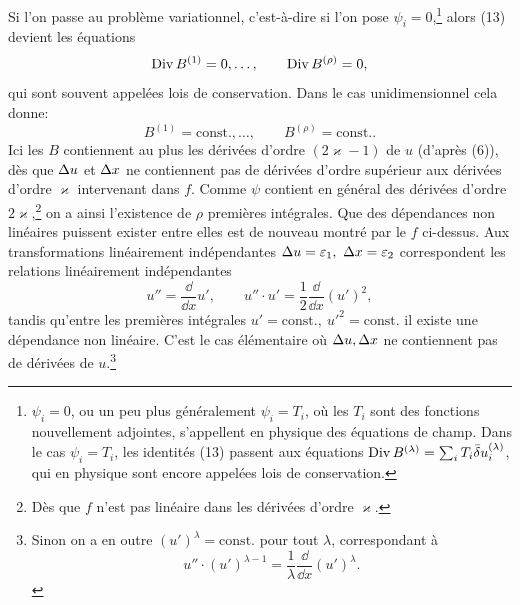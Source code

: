 Si l'on passe au problème variationnel, c'est-à-dire si l'on pose \(\psi_i=0\),\footnote{\(\psi_i=0\), ou un peu plus généralement \(\psi_i=T_i\), où les \(T_i\) sont des fonctions nouvellement adjointes, s'appellent en physique des \og{}équations de champ\fg{}. Dans le cas \(\psi_i=T_i\), les identités (13) passent aux équations \(\operatorname{Div} B^{(\lambda)}=\sum_i T_i\bar{\delta} u_i^{(\lambda)}\), qui en physique sont encore appelées lois de conservation.} alors (13) devient les équations
\[
\operatorname{Div} B^{(1)}=0,\ldots,\qquad \operatorname{Div} B^{(\rho)}=0,
\]
qui sont souvent appelées \og{}lois de conservation\fg{}. Dans le cas unidimensionnel cela donne:
\[
B^{(1)}=\mathrm{const.},\ldots,\qquad B^{(\rho)}=\mathrm{const.}.
\]
Ici les \(B\) contiennent au plus les dérivées d'ordre \((2\varkappa-1)\) de \(u\) (d'après (6)), dès que \(\Delta u\) et \(\Delta x\) ne contiennent pas de dérivées d'ordre supérieur aux dérivées d'ordre \(\varkappa\) intervenant dans \(f\). Comme \(\psi\) contient en général des dérivées d'ordre \(2\varkappa\),\footnote{Dès que \(f\) n'est pas linéaire dans les dérivées d'ordre \(\varkappa\).} on a ainsi l'existence de \(\rho\) premières intégrales. Que des dépendances non linéaires puissent exister entre elles est de nouveau montré par le \(f\) ci-dessus. Aux transformations linéairement indépendantes \(\Delta u=\varepsilon_1,\ \Delta x=\varepsilon_2\) correspondent les relations linéairement indépendantes
\[
u''=\frac{\dd}{\dd x}u',\qquad
u''\cdot u'=\frac12\frac{\dd}{\dd x}(u')^2,
\]
tandis qu'entre les premières intégrales \(u'=\mathrm{const.},\ u'^2=\mathrm{const.}\) il existe une dépendance non linéaire. C'est le cas élémentaire où \(\Delta u,\Delta x\) ne contiennent pas de dérivées de \(u\).\footnote{Sinon on a en outre \((u')^\lambda=\mathrm{const.}\) pour tout \(\lambda\), correspondant à
\[
u''\cdot (u')^{\lambda-1}=\frac1\lambda\frac{\dd}{\dd x}(u')^\lambda.
\]}
